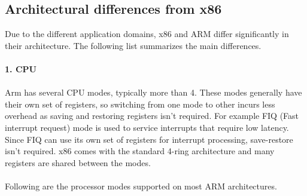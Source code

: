 \documentclass[a4paper,10pt]{article}
\begin{document}
\subsection{Architectural differences from x86}
Due to the different application domains, x86 and ARM differ significantly in their architecture. The following list summarizes the main differences.
\\\\
\textbf{1. CPU}
\\\\
Arm has several CPU modes, typically more than 4. These modes generally have their own set of registers, so switching from one mode to other incurs less overhead as saving and restoring registers isn't required. For example FIQ (Fast interrupt request) mode is used to service interrupts that require low latency. Since FIQ can use its own set of registers for interrupt processing, save-restore isn't required.
x86 comes with the standard 4-ring architecture and many registers are shared between the modes.
\\\\Following are the processor modes supported on most ARM architectures.\\
\end{document}

